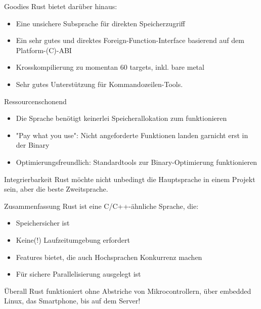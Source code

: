 \documentclass{beamer}
\begin{document}
\begin{frame}{Goodies}
	Rust bietet darüber hinaus:

	\begin{itemize}
		\item Eine unsichere Subsprache für direkten Speicherzugriff
		\item Ein sehr gutes und direktes Foreign-Function-Interface basierend auf dem Platform-(C)-ABI
		\item Krosskompilierung zu momentan 60 targets, inkl. bare metal
		\item Sehr gutes Unterstützung für Kommandozeilen-Tools.
	\end{itemize}
\end{frame}


\begin{frame}{Ressourcenschonend}
	\begin{itemize}
		\item Die Sprache benötigt keinerlei Speicherallokation zum funktionieren
		\item "Pay what you use": Nicht angeforderte Funktionen landen garnicht erst in der Binary
		\item Optimierungsfreundlich: Standardtools zur Binary-Optimierung funktionieren
	\end{itemize}
\end{frame}

\begin{frame}{Integrierbarkeit}
	Rust möchte nicht unbedingt die Hauptsprache in einem Projekt sein, aber die beste Zweitsprache.
\end{frame}


\begin{frame}{Zusammenfassung}
	Rust ist eine C/C++-ähnliche Sprache, die:

	\begin{itemize}
		\item Speichersicher ist
		\item Keine(!) Laufzeitumgebung erfordert
		\item Features bietet, die auch Hochsprachen Konkurrenz machen
		\item Für sichere Parallelisierung ausgelegt ist
	\end{itemize}
\end{frame}

\begin{frame}{Überall}
	Rust funktioniert ohne Abstriche von Mikrocontrollern, über embedded Linux, das Smartphone, bis auf dem Server!
\end{frame}
\end{document}
